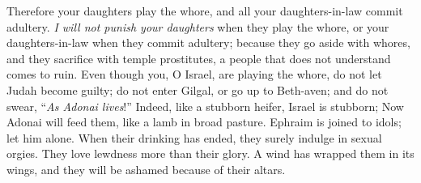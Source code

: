 \begin{biblechapter}
Therefore your daughters play the whore, 
and all your daughters-in-law commit adultery.
\verse \textit{I will not punish your daughters} when they play the whore, 
or your daughters-in-law when they commit adultery; 
because they go aside with whores, 
and they sacrifice with temple prostitutes, 
a people that does not understand comes to ruin.
\verse Even though you, O Israel, are playing the whore, 
do not let Judah become guilty; 
do not enter Gilgal, 
or go up to Beth-aven; 
and do not swear, 
“\textit{As Adonai lives}!”
\verse Indeed, like a stubborn heifer, 
Israel is stubborn; 
Now Adonai will feed them, 
like a lamb in broad pasture.
\verse Ephraim is joined to idols; 
let him alone.
\verse When their drinking has ended, 
they surely indulge in sexual orgies. 
They love lewdness more than their glory.
\verse A wind has wrapped them in its wings, 
and they will be ashamed because of their altars.
\end{biblechapter}

